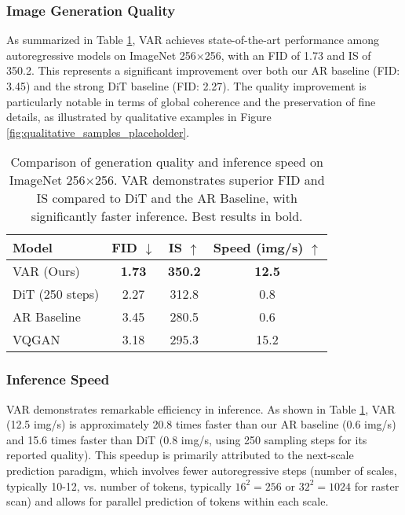 \documentclass{article}
\begin{document}
\subsubsection{Image Generation Quality}
As summarized in Table \ref{tab:main_results}, VAR achieves state-of-the-art performance among autoregressive models on ImageNet 256$\times$256, with an FID of 1.73 and IS of 350.2. This represents a significant improvement over both our AR baseline (FID: 3.45) and the strong DiT baseline (FID: 2.27). The quality improvement is particularly notable in terms of global coherence and the preservation of fine details, as illustrated by qualitative examples in Figure \ref{fig:qualitative_samples_placeholder}.

\begin{table}[htbp]
\centering
\caption{Comparison of generation quality and inference speed on ImageNet 256$\times$256. VAR demonstrates superior FID and IS compared to DiT and the AR Baseline, with significantly faster inference. Best results in bold.}
\label{tab:main_results}
\begin{tabular}{lccc}
\toprule
Model & FID $\downarrow$ & IS $\uparrow$ & Speed (img/s) $\uparrow$ \\
\midrule
VAR (Ours)    & \textbf{1.73} & \textbf{350.2} & \textbf{12.5} \\
DiT (250 steps) & 2.27          & 312.8          & 0.8 \\
AR Baseline   & 3.45          & 280.5          & 0.6 \\
VQGAN         & 3.18          & 295.3          & 15.2 \\ %
\bottomrule
\end{tabular}
\end{table}

\subsubsection{Inference Speed}
VAR demonstrates remarkable efficiency in inference. As shown in Table \ref{tab:main_results}, VAR (12.5 img/s) is approximately 20.8 times faster than our AR baseline (0.6 img/s) and 15.6 times faster than DiT (0.8 img/s, using 250 sampling steps for its reported quality). This speedup is primarily attributed to the next-scale prediction paradigm, which involves fewer autoregressive steps (number of scales, typically 10-12, vs. number of tokens, typically $16^2=256$ or $32^2=1024$ for raster scan) and allows for parallel prediction of tokens within each scale.
\end{document}
